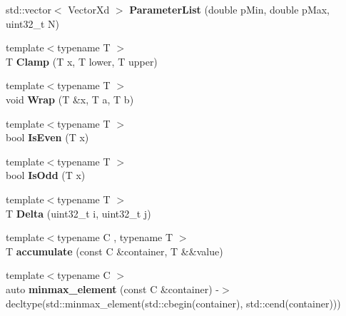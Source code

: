\begin{DoxyCompactItemize}
\item 
\hypertarget{namespace_d_r_d_s_p_a32c1a9bd002d98aab0fc8818f9dc976e}{std\-::vector$<$ Vector\-Xd $>$ {\bfseries Parameter\-List} (double p\-Min, double p\-Max, uint32\-\_\-t N)}\label{namespace_d_r_d_s_p_a32c1a9bd002d98aab0fc8818f9dc976e}

\item 
\hypertarget{namespace_d_r_d_s_p_a2d0b3c508a2a29b8543ddd55d3d55a0c}{{\footnotesize template$<$typename T $>$ }\\T {\bfseries Clamp} (T x, T lower, T upper)}\label{namespace_d_r_d_s_p_a2d0b3c508a2a29b8543ddd55d3d55a0c}

\item 
\hypertarget{namespace_d_r_d_s_p_abfcccc8537d8c84ec19951dbd6ce22e3}{{\footnotesize template$<$typename T $>$ }\\void {\bfseries Wrap} (T \&x, T a, T b)}\label{namespace_d_r_d_s_p_abfcccc8537d8c84ec19951dbd6ce22e3}

\item 
\hypertarget{namespace_d_r_d_s_p_a415fff140e4195c2e7a4302766051864}{{\footnotesize template$<$typename T $>$ }\\bool {\bfseries Is\-Even} (T x)}\label{namespace_d_r_d_s_p_a415fff140e4195c2e7a4302766051864}

\item 
\hypertarget{namespace_d_r_d_s_p_abe0edfd6434cc15f79ab1815d13c2925}{{\footnotesize template$<$typename T $>$ }\\bool {\bfseries Is\-Odd} (T x)}\label{namespace_d_r_d_s_p_abe0edfd6434cc15f79ab1815d13c2925}

\item 
\hypertarget{namespace_d_r_d_s_p_a74155c7b3a7af163c966f6b5ed0e0c99}{{\footnotesize template$<$typename T $>$ }\\T {\bfseries Delta} (uint32\-\_\-t i, uint32\-\_\-t j)}\label{namespace_d_r_d_s_p_a74155c7b3a7af163c966f6b5ed0e0c99}

\item 
\hypertarget{namespace_d_r_d_s_p_a21ba4cb82daaae5682efe61c8fa176f7}{{\footnotesize template$<$typename C , typename T $>$ }\\T {\bfseries accumulate} (const C \&container, T \&\&value)}\label{namespace_d_r_d_s_p_a21ba4cb82daaae5682efe61c8fa176f7}

\item 
\hypertarget{namespace_d_r_d_s_p_a81df97d7847395b00eb91969cfaaf138}{{\footnotesize template$<$typename C $>$ }\\auto {\bfseries minmax\-\_\-element} (const C \&container) -\/$>$ decltype(std\-::minmax\-\_\-element(std\-::cbegin(container), std\-::cend(container)))}\label{namespace_d_r_d_s_p_a81df97d7847395b00eb91969cfaaf138}


\end{DoxyCompactItemize}
